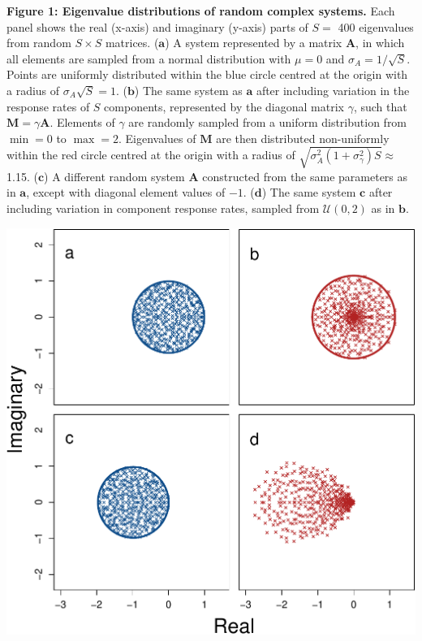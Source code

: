 \documentclass[]{article}
\begin{document}
\textbf{Figure 1: Eigenvalue distributions of random complex systems.}
Each panel shows the real (x-axis) and imaginary (y-axis) parts of
\(S =\) 400 eigenvalues from random \(S \times S\) matrices.
(\(\textbf{a}\)) A system represented by a matrix \(\mathbf{A}\), in
which all elements are sampled from a normal distribution with
\(\mu = 0\) and \(\sigma_{A} = 1/\sqrt{S}\). Points are uniformly
distributed within the blue circle centred at the origin with a radius
of \(\sigma_{A} \sqrt{S} = 1\). (\(\textbf{b}\)) The same system as
\(\textbf{a}\) after including variation in the response rates of \(S\)
components, represented by the diagonal matrix \(\gamma\), such that
\(\mathbf{M} = \gamma\mathbf{A}\). Elements of \(\gamma\) are randomly
sampled from a uniform distribution from \(\min = 0\) to \(\max = 2\).
Eigenvalues of \(\mathbf{M}\) are then distributed non-uniformly within
the red circle centred at the origin with a radius of
\(\sqrt{\sigma^{2}_{A}(1 + \sigma^{2}_{\gamma})S} \approx\) 1.15.
(\(\textbf{c}\)) A different random system \(\mathbf{A}\) constructed
from the same parameters as in \(\textbf{a}\), except with diagonal
element values of \(-1\). (\(\textbf{d}\)) The same system
\(\textbf{c}\) after including variation in component response rates,
sampled from \(\mathcal{U}(0, 2)\) as in \(\textbf{b}\).

\includegraphics{ms_files/figure-latex/unnamed-chunk-8-1.pdf}
\end{document}
